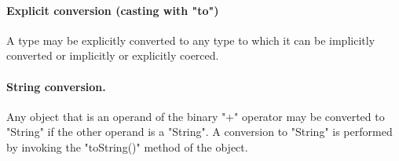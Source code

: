 
\paragraph{Explicit conversion (casting with \xcd"to")}
A type may be explicitly converted to any type to which it can be
implicitly converted or implicitly or explicitly coerced.


\paragraph{String conversion.}
Any object that is an operand of the binary
\xcd"+" operator may
be converted to \xcd"String" if the other operand is a \xcd"String".
A conversion to \xcd"String" is performed by invoking the \xcd"toString()"
method of the object.


